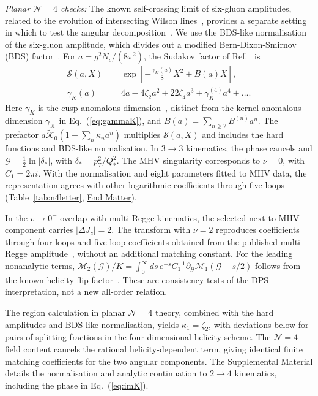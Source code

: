 \documentclass[%
 twocolumn,
 superscriptaddress,
 preprintnumbers,
 nofootinbib,
 amsmath,amssymb,
 aps,
 prl,
]{revtex4-2}
\newcommand{\G}{\mathcal G}
\newcommand{\M}{\mathcal M}
\newcommand{\Kt}{\widetilde{\mathcal K}}
\begin{document}
\textit{Planar $\mathcal N=4$ checks:}
The known self-crossing limit of six-gluon
amplitudes, related to the evolution of
intersecting Wilson lines~\cite{Korchemskaya:1994qp,Dixon:2016epj},
provides a separate setting in which to test
the angular decomposition~\cite{CaronHuot:2019vjl}.
We use the BDS-like normalisation of the six-gluon amplitude,
which divides out a modified Bern-Dixon-Smirnov (BDS)
factor~\cite{Dixon:2016epj}. For $a=g^2N_c/(8\pi^2)$,
the Sudakov factor of Ref.~\cite{Dixon:2016epj} is
\begin{equation}
\begin{aligned}
\mathcal S(a,X)
&=\exp\left[-\frac{\gamma_K(a)}8X^2+B(a)X\right],\\
\gamma_K(a)
&=4a-4\zeta_2a^2+22\zeta_4a^3
+\gamma_K^{(4)}a^4+\ldots .
\end{aligned}
\label{eq:n4exp}
\end{equation}
%
Here $\gamma_K$ is the cusp anomalous dimension~\cite{Beisert:2006ez}, distinct from the kernel
anomalous dimension $\gamma_{\mathcal K}$ in
Eq.~(\ref{eq:gammaK}), and
$B(a)=\sum_{n\ge2}B^{(n)}a^n$.
The prefactor $a\Kt_0(1+\sum_n\kappa_na^n)$
multiplies $\mathcal S(a,X)$ and includes the
hard functions and BDS-like normalisation.
In $3\to3$ kinematics, the phase cancels and
$\G=\tfrac12\ln|\delta_*|$, with
$\delta_*=p_T^2/Q_*^2$.
The MHV singularity corresponds to $\nu=0$,
with $C_1=2\pi i$.
With the normalisation and eight parameters fitted
to MHV data, the representation agrees with
\nFourPass{} other logarithmic coefficients
through five loops
(Table~\ref{tab:n4letter},
\hyperref[sec:endmatter]{End Matter}).


In the $v\to0^-$ overlap with multi-Regge kinematics, the selected
next-to-MHV component carries $|\Delta J_z|=2$. The transform with
$\nu=2$ reproduces \nFourNmhvChecked{} coefficients through four loops
and \nFourNmhvFiveCount{} five-loop coefficients obtained from the
published multi-Regge amplitude~\cite{CaronHuot:2019vjl}, without an
additional matching constant. For the leading nonanalytic terms,
$\M_2(\G)/K=\int_0^\infty ds\,e^{-s}C_1^{-1}
\partial_\G\M_1(\G-s/2)$ follows from the known helicity-flip
factor~\cite{Basso:2014bfkl,CaronHuot:2019vjl}. These are consistency
tests of the DPS interpretation, not a new all-order relation.


The region calculation in planar $\mathcal N=4$ theory,
combined with the hard amplitudes and BDS-like
normalisation, yields $\kappa_1=\zeta_2$, with
deviations below \kappaOneReg{} for \nFourRegPairs{}
pairs of splitting fractions in the four-dimensional
helicity scheme. The $\mathcal N=4$ field content
cancels the rational helicity-dependent term, giving
identical finite matching coefficients for the two
angular components. The Supplemental Material details
the normalisation and analytic continuation to $2\to4$
kinematics, including the phase in
Eq.~(\ref{eq:imK}).
\end{document}
